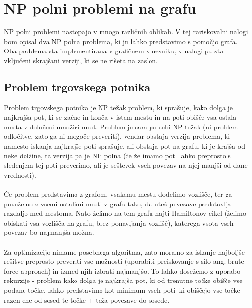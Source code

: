\documentclass[11pt]{article}
\begin{document}
\section{NP polni problemi na grafu}

NP polni problemi nastopajo v mnogo različnih oblikah. V tej raziskovalni nalogi bom opisal dva NP polna problema, ki ju lahko predstavimo s pomočjo grafa. Oba problema sta implementirana v grafičnem vmesniku, v nalogi pa sta vključeni skrajšani verziji, ki se ne rišeta na zaslon.

\subsection{Problem trgovskega potnika}

Problem trgovskega potnika je NP težak problem, ki sprašuje, kako dolga je najkrajša pot, ki se začne in konča v istem mestu in na poti obišče vsa ostala mesta v določeni množici mest. Problem je sam po sebi NP težak (ni problem odločitve, zato ga ni mogoče preveriti), vendar obstaja verzija problema, ki namesto iskanja najkrajše poti sprašuje, ali obstaja pot na grafu, ki je krajša od neke dolžine, ta verzija pa je NP polna (če že imamo pot, lahko preprosto s sledenjem tej poti preverimo, ali je seštevek vseh povezav na njej manjši od dane vrednosti).
\\ \\
Če problem predstavimo z grafom, vsakemu mestu dodelimo vozlišče, ter ga povežemo z vsemi ostalimi mesti v grafu tako, da utež povezave predstavlja razdaljo med mestoma. Nato želimo na tem grafu najti Hamiltonov cikel (želimo obiskati vsa vozlišča na grafu, brez ponavljanja vozlišč), katerega vsota vseh povezav bo najmanjša možna.
\\ \\
Za optimizacijo nimamo posebnega algoritma, zato moramo za iskanje najboljše rešitve preprosto preveriti vse možnosti (uporabiti preiskovanje s silo ang. brute force approach) in izmed njih izbrati najmanjšo. To lahko dosežemo z uporabo rekurzije - problem kako dolga je najkrajša pot, ki od trenutne točke obišče vse podane točke, lahko predstavimo kot minimum vseh poti, ki obiščejo vse točke razen ene od sosed te točke + teža povezave do sosede.
\\ \\
\end{document}
